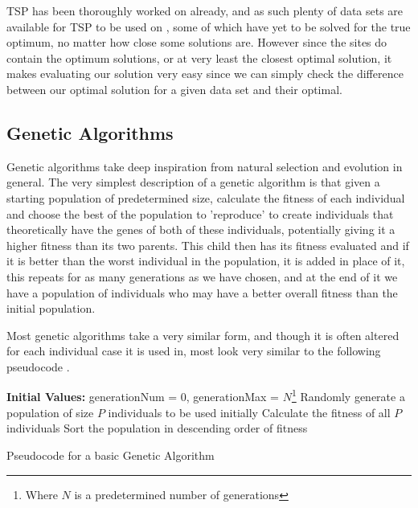 \documentclass[11pt,a4paper,titlepage]{article}
\begin{document}
TSP has been thoroughly worked on already, and as such plenty of data sets are available for TSP to be used on \cite{TSPRep1, TSPRep2}, some of which have yet to be solved for the true optimum, no matter how close some solutions are. However since the sites do contain the optimum solutions, or at very least the closest optimal solution, it makes evaluating our solution very easy since we can simply check the difference between our optimal solution for a given data set and their optimal.

\subsection{Genetic Algorithms}
Genetic algorithms take deep inspiration from natural selection and evolution in general. The very simplest description of a genetic algorithm is that given a starting population of predetermined size, calculate the fitness of each individual and choose the best of the population to 'reproduce' to create individuals that theoretically have the genes of both of these individuals, potentially giving it a higher fitness than its two parents. This child then has its fitness evaluated and if it is better than the worst individual in the population, it is added in place of it, this repeats for as many generations as we have chosen, and at the end of it we have a population of individuals who may have a better overall fitness than the initial population.

Most genetic algorithms take a very similar form, and though it is often altered for each individual case it is used in, most look very similar to the following pseudocode \cite{GAIntro}.
\clearpage

\begin{algorithm}[H]
\SetAlgoLined
\textbf{Initial Values:} generationNum = 0, generationMax = $N$\footnote{Where $N$ is a predetermined number of generations}\;
Randomly generate a population of size $P$ individuals to be used initially\;
Calculate the fitness of all $P$ individuals\;
Sort the population in descending order of fitness\;
\caption{Pseudocode for a basic Genetic Algorithm}
\end{algorithm}
\end{document}

